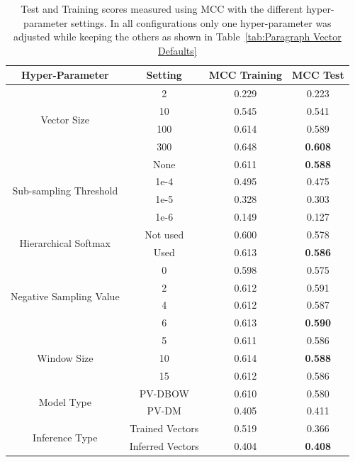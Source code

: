 \begin{table}[h]
  \begin{center}
    \begin{tabular}{ c | c | c | c }
      \toprule
      Hyper-Parameter & Setting & \gls{MCC} Training & \gls{MCC} Test\\
      \midrule
      \multirow{4}{*}{Vector Size}
       & 2 & 0.229 & 0.223 \\
       & 10  & 0.545 & 0.541 \\
       & 100 & 0.614 & 0.589 \\
       & 300 & 0.648 & \textbf{0.608} \\
      \midrule
      \multirow{4}{*}{Sub-sampling Threshold}
       & None & 0.611 & \textbf{0.588} \\
       & 1e-4 & 0.495 & 0.475 \\
       & 1e-5 & 0.328 & 0.303 \\
       & 1e-6 & 0.149 & 0.127 \\
      \midrule
      \multirow{2}{*}{Hierarchical Softmax}
       & Not used & 0.600 & 0.578 \\
       & Used     & 0.613 & \textbf{0.586} \\
      \midrule
      \multirow{4}{*}{Negative Sampling Value}
       & 0 & 0.598 & 0.575 \\
       & 2 & 0.612 & 0.591 \\
       & 4 & 0.612 & 0.587 \\
       & 6 & 0.613 & \textbf{0.590} \\
      \midrule
      \multirow{3}{*}{Window Size}
       & 5  & 0.611 & 0.586 \\
       & 10 & 0.614 & \textbf{0.588} \\
       & 15 & 0.612 & 0.586 \\
      \midrule
      \multirow{2}{*}{Model Type}
       & PV-DBOW & 0.610 & 0.580 \\
       & PV-DM   & 0.405 & 0.411 \\
      \midrule
      \multirow{2}{*}{Inference Type}
       & Trained Vectors  & 0.519 & 0.366 \\
       & Inferred Vectors & 0.404 & \textbf{0.408} \\
      \bottomrule
    \end{tabular}
  \caption{Test and Training scores measured using \gls{MCC} with the different hyper-parameter settings. In all configurations only one hyper-parameter was adjusted while keeping the others as shown in Table~\ref{tab:Paragraph Vector Defaults}}
\label{tab:Paragraph Vector Parameter Hyper-Parameter Results}
\end{center}
\end{table}

